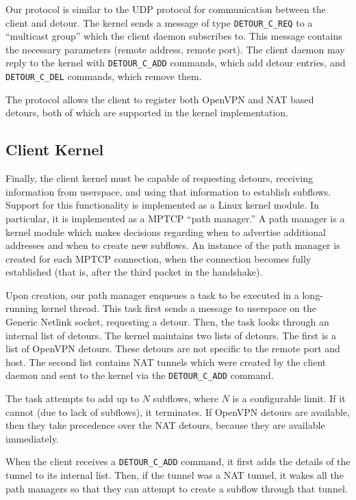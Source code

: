 Our protocol is similar to the UDP protocol for communication between the client
and detour. The kernel sends a message of type \texttt{DETOUR_C_REQ} to a
``multicast group'' which the client daemon subscribes to. This message contains
the necessary parameters (remote address, remote port). The client daemon may
reply to the kernel with \texttt{DETOUR_C_ADD} commands, which add detour
entries, and \texttt{DETOUR_C_DEL} commands, which remove them.

The protocol allows the client to register both OpenVPN and NAT based detours,
both of which are supported in the kernel implementation.

\subsection{Client Kernel}

Finally, the client kernel must be capable of requesting detours, receiving
information from userspace, and using that information to establish subflows.
Support for this functionality is implemented as a Linux kernel module. In
particular, it is implemented as a MPTCP ``path manager.'' A path manager is a
kernel module which makes decisions regarding when to advertise additional
addresses and when to create new subflows. An instance of the path manager is
created for each MPTCP connection, when the connection becomes fully established
(that is, after the third packet in the handshake).

Upon creation, our path manager enqueues a task to be executed in a long-running
kernel thread. This task first sends a message to userspace on the Generic
Netlink socket, requesting a detour. Then, the task looks through an internal
list of detours. The kernel maintains two lists of detours. The first is a list
of OpenVPN detours. These detours are not specific to the remote port and host.
The second list contains NAT tunnels which were created by the client daemon and
sent to the kernel via the \texttt{DETOUR_C_ADD} command.

The task attempts to add up to $N$ subflows, where $N$ is a configurable limit.
If it cannot (due to lack of subflows), it terminates. If OpenVPN detours are
available, then they take precedence over the NAT detours, because they are
available immediately.

When the client receives a \texttt{DETOUR_C_ADD} command, it first adds the
details of the tunnel to its internal list. Then, if the tunnel was a NAT
tunnel, it wakes all the path managers so that they can attempt to create a
subflow through that tunnel.
